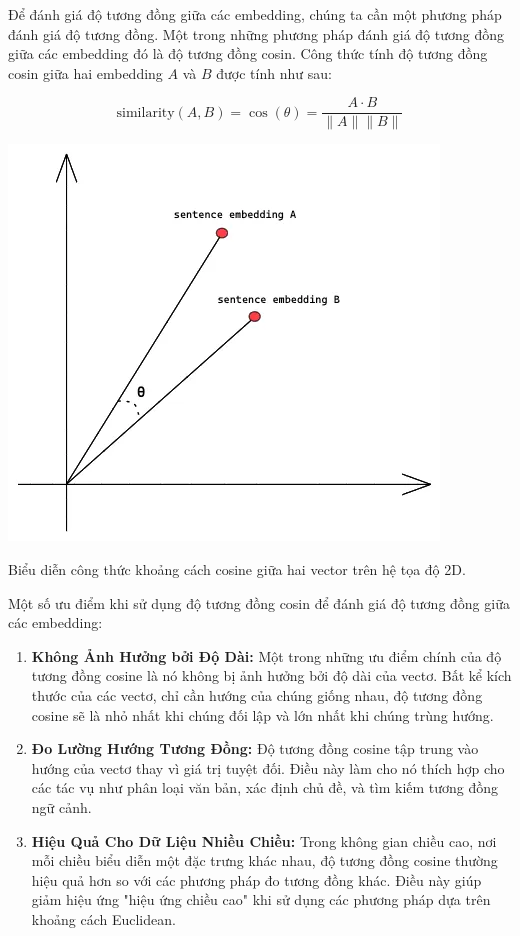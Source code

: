 \documentclass[a4paper, 12pt, openany]{book}
\begin{document}
Để đánh giá độ tương đồng giữa các embedding, chúng ta cần một phương pháp đánh giá độ tương đồng. Một trong những phương pháp đánh giá độ tương đồng giữa các embedding đó là độ tương đồng cosin. Công thức tính độ tương đồng cosin giữa hai embedding $A$ và $B$ được tính như sau:

\begin{equation}
    \text{similarity}(A, B) = \cos(\theta) = \frac{A \cdot B}{\|A\| \|B\|}
\end{equation}

\begin{minipage}{\linewidth}
    \captionsetup{type=figure}
    \centering
    \includegraphics[width=.6\linewidth]{./assets/images/cosine.png}
    \caption{Biểu diễn công thức khoảng cách cosine giữa hai vector trên hệ tọa độ 2D.}
\end{minipage}
\vspace{0.5cm}

Một số ưu điểm khi sử dụng độ tương đồng cosin để đánh giá độ tương đồng giữa các embedding:
\begin{enumerate}
    \item \textbf{Không Ảnh Hưởng bởi Độ Dài:} Một trong những ưu điểm chính của độ tương đồng cosine là nó không bị ảnh hưởng bởi độ dài của vectơ. Bất kể kích thước của các vectơ, chỉ cần hướng của chúng giống nhau, độ tương đồng cosine sẽ là nhỏ nhất khi chúng đối lập và lớn nhất khi chúng trùng hướng.

    \item \textbf{Đo Lường Hướng Tương Đồng:} Độ tương đồng cosine tập trung vào hướng của vectơ thay vì giá trị tuyệt đối. Điều này làm cho nó thích hợp cho các tác vụ như phân loại văn bản, xác định chủ đề, và tìm kiếm tương đồng ngữ cảnh.

    \item \textbf{Hiệu Quả Cho Dữ Liệu Nhiều Chiều:} Trong không gian chiều cao, nơi mỗi chiều biểu diễn một đặc trưng khác nhau, độ tương đồng cosine thường hiệu quả hơn so với các phương pháp đo tương đồng khác. Điều này giúp giảm hiệu ứng "hiệu ứng chiều cao" khi sử dụng các phương pháp dựa trên khoảng cách Euclidean.
\end{enumerate}
\end{document}
